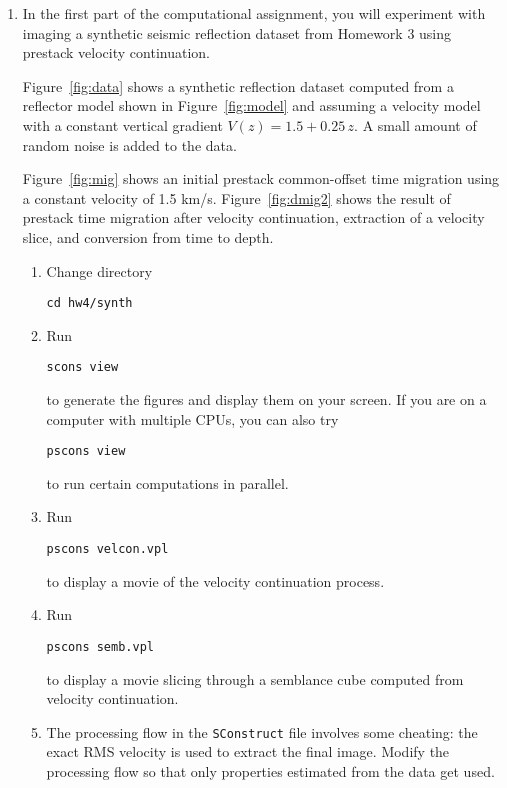 \begin{enumerate}
\item In the first part of the computational assignment, you will experiment with 
  imaging a synthetic seismic reflection dataset from Homework 3 using
  prestack velocity continuation.



Figure~\ref{fig:data} shows a synthetic reflection dataset computed
from a reflector model shown in Figure~\ref{fig:model} and assuming a
velocity model with a constant vertical gradient $V(z) = 1.5 +
0.25\,z$. A small amount of random noise is added to the data.

Figure~\ref{fig:mig} shows an initial prestack common-offset time
migration using a constant velocity of 1.5 km/s. 
Figure~\ref{fig:dmig2} shows the result of prestack time
migration after velocity continuation, extraction of a velocity slice,
and conversion from time to depth.

\begin{enumerate}
\item Change directory 
\begin{verbatim}
cd hw4/synth
\end{verbatim}
\item Run
\begin{verbatim}
scons view
\end{verbatim}
to generate the figures and display them on your screen.
If you are on a computer with multiple CPUs, you
can also try
\begin{verbatim}
pscons view
\end{verbatim}
to run certain computations in parallel.
\item Run 
\begin{verbatim}
pscons velcon.vpl
\end{verbatim}
to display a movie of the velocity continuation process.
\item Run 
\begin{verbatim}
pscons semb.vpl
\end{verbatim}
to display a movie slicing through a semblance cube computed from
velocity continuation.
\item The processing flow in the \texttt{SConstruct} file involves
  some cheating: the exact RMS velocity is used to extract the final
  image. Modify the processing flow so that only properties estimated
  from the data get used. 
\end{enumerate}


\end{enumerate}
